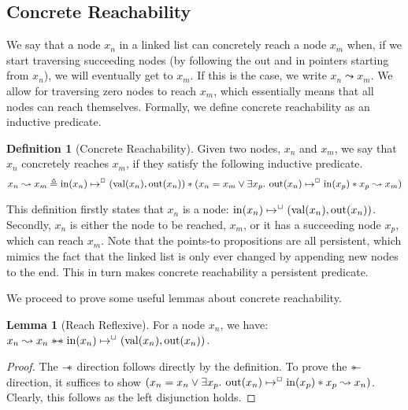 \documentclass[a4paper, 10pt]{report}
\theoremstyle{definition}
\newtheorem{lemma}[theorem]{Lemma}
\newtheorem{definition}{Definition}[section]
\newcommand{\nIn}[1]{\operatorname{in}(#1)}
\newcommand{\nVal}[1]{\operatorname{val}(#1)}
\newcommand{\nOut}[1]{\operatorname{out}(#1)}
\newcommand{\node}{x}
\newcommand{\nodeM}[1]{\node_{#1}}
\newcommand{\isNode}[1]{\nIn{#1} \mapsto^{\persistently} (\nVal{#1}, \nOut{#1})}
\newcommand{\reach}[2]{#1 \leadsto #2}
\begin{document}
\subsection{Concrete Reachability}
We say that a node $\nodeM{n}$ in a linked list can concretely reach a node $\nodeM{m}$ when, if we start traversing succeeding nodes (by following the out and in pointers starting from $\nodeM{n}$), we will eventually get to $\nodeM{m}$. If this is the case, we write $\reach{\nodeM{n}}{\nodeM{m}}$. We allow for traversing zero nodes to reach $\nodeM{m}$, which essentially means that all nodes can reach themselves. Formally, we define concrete reachability as an inductive predicate.
\begin{definition}[Concrete Reachability]
  Given two nodes, $\nodeM{n}$ and $\nodeM{m}$, we say that $\nodeM{n}$ concretely reaches $\nodeM{m}$, if they satisfy the following inductive predicate.
  \begin{equation*}
    \reach{\nodeM{n}}{\nodeM{m}} \eqdef \isNode{\nodeM{n}} \star{} (\nodeM{n} = \nodeM{m} \lor{} \Exists \nodeM{p} . \nOut{\nodeM{n}} \mapsto^{\persistently} \nIn{\nodeM{p}} \star{} \reach{\nodeM{p}}{\nodeM{m}})
  \end{equation*}
\end{definition}
This definition firstly states that $\nodeM{n}$ is a node: $\isNode{\nodeM{n}}$. Secondly, $\nodeM{n}$ is either the node to be reached, $\nodeM{m}$, or it has a succeeding node $\nodeM{p}$, which can reach $\nodeM{m}$.
Note that the points-to propositions are all persistent, which mimics the fact that the linked list is only ever changed by appending new nodes to the end. This in turn makes concrete reachability a persistent predicate.

We proceed to prove some useful lemmas about concrete reachability.
\begin{lemma}[Reach Reflexive]\label{lemma:reach-reflexive}
  For a node $\nodeM{n}$, we have: $\reach{\nodeM{n}}{\nodeM{n}} \wandIff \isNode{\nodeM{n}}$.
\end{lemma}
\begin{proof}
  The $\mathrel{-\!\!*}$ direction follows directly by the definition. To prove the $\mathrel{*\!\!-}$ direction, it suffices to show $(\nodeM{n} = \nodeM{n} \lor{} \Exists \nodeM{p} . \nOut{\nodeM{n}} \mapsto^{\persistently} \nIn{\nodeM{p}} \star{} \reach{\nodeM{p}}{\nodeM{n}})$. Clearly, this follows as the left disjunction holds.
\end{proof}
\end{document}
